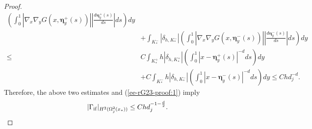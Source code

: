 \documentclass[1996/10/24]{amsart}
\theoremstyle{definition}
\numberwithin{equation}{section}
\begin{document}
\begin{proof}
\begin{align*}
\left(\int_{0}^{1} \left| \nabla_{x} \nabla_y G(x,\boldsymbol{\eta}_{y}^{+}(s))\right|
\left|\frac{d \boldsymbol{\eta}_{y}^{+}(s)}{ds}\right|ds\right) dy\\
&+\int_{K_{\ast}^-}\left|\delta_{h,K_{\ast}^-}\right|
\left(\int_{0}^{1} \left| \nabla_{x} \nabla_y G(x,\boldsymbol{\eta}_{y}^{-}(s))\right|
\left|\frac{d \boldsymbol{\eta}_{y}^{-}(s)}{ds}\right|ds\right) dy\\
\leq& C\int_{K_{\ast}^+}h\left|\delta_{h,K_{\ast}^+}\right|
\left(\int_{0}^{1}\left| x - \boldsymbol{\eta}_{y}^{+}(s) \right|^{-d} ds \right) dy\\
&+C\int_{K_{\ast}^-}h\left|\delta_{h,K_{\ast}^-}\right|
\left(\int_{0}^{1}\left| x - \boldsymbol{\eta}_{y}^{-}(s) \right|^{-d} ds \right)dy\leq Chd_j^{-d}.
\end{align*}
Therefore, the above two estimates and (\ref{ee-rG23-proof:1}) imply
\begin{align*}
|\Gamma_{{\rm if}}|_{H^2(\Omega_j^2(x_{\ast}))}\leq Chd_j^{-1-\frac{d}{2}}.
\end{align*}


\end{proof}
\end{document}
